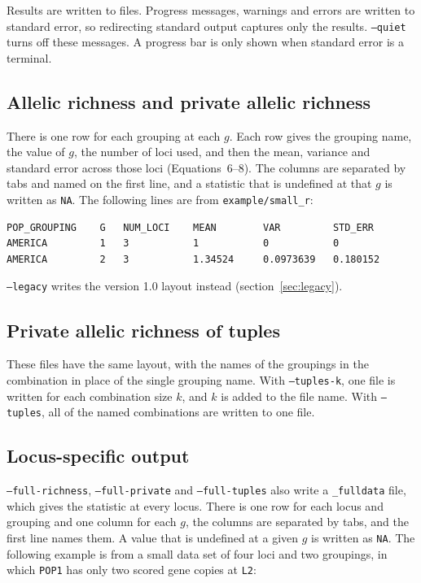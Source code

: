 \documentclass[11pt]{article}
\newcommand{\flag}[1]{\texttt{#1}}
\begin{document}
Results are written to files. Progress messages, warnings and errors are
written to standard error, so redirecting standard output captures only the
results. \flag{--quiet} turns off these messages. A progress bar is only shown
when standard error is a terminal.

\subsection{Allelic richness and private allelic richness}

There is one row for each grouping at each $g$. Each row gives the grouping
name, the value of $g$, the number of loci used, and then the mean, variance
and standard error across those loci (Equations~6--8). The columns are
separated by tabs and named on the first line, and a statistic that is
undefined at that $g$ is written as \texttt{NA}. The following lines are from
\texttt{example/small\_r}:

\begin{Verbatim}[xleftmargin=1em,fontsize=\small]
POP_GROUPING    G   NUM_LOCI    MEAN        VAR         STD_ERR
AMERICA         1   3           1           0           0
AMERICA         2   3           1.34524     0.0973639   0.180152
\end{Verbatim}

\noindent \flag{--legacy} writes the version 1.0 layout instead
(section~\ref{sec:legacy}).

\subsection{Private allelic richness of tuples}

These files have the same layout, with the names of the groupings in the
combination in place of the single grouping name. With \flag{--tuples-k}, one
file is written for each combination size $k$, and $k$ is added to the file
name. With \flag{--tuples}, all of the named combinations are written to one
file.

\subsection{Locus-specific output}
\label{sec:fulldata}

\flag{--full-richness}, \flag{--full-private} and \flag{--full-tuples} also
write a \texttt{\_fulldata} file, which gives the statistic at every locus.
There is one row for each locus and grouping and one column for each $g$, the
columns are separated by tabs, and the first line names them. A value that is
undefined at a given $g$ is written as \texttt{NA}. The following example is
from a small data set of four loci and two groupings, in which \texttt{POP1}
has only two scored gene copies at \texttt{L2}:
\end{document}
